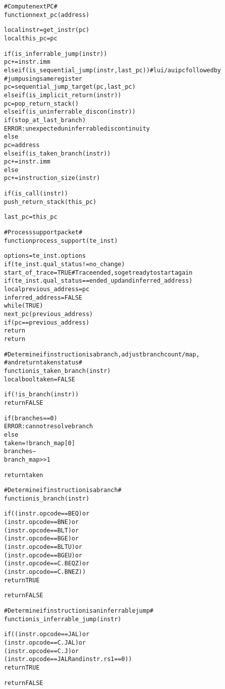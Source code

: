\begin{alltt}
# Compute next PC #
function next_pc (address)

  local instr   = get_instr(pc)
  local this_pc = pc

  if (is_inferrable_jump(instr))
    pc += instr.imm
  else if (is_sequential_jump(instr, last_pc)) # lui/auipc followed by
                                               #  jump using same register
    pc = sequential_jump_target(pc, last_pc)
  else if (is_implicit_return(instr))
    pc = pop_return_stack()
  else if (is_uninferrable_discon(instr))
    if (stop_at_last_branch)
      ERROR: unexpected uninferrable discontinuity
    else
      pc = address
  else if (is_taken_branch(instr))
    pc += instr.imm
  else
    pc += instruction_size(instr)

  if (is_call(instr))
    push_return_stack(this_pc)

  last_pc = this_pc

# Process support packet #
function process_support (te_inst)

  options = te_inst.options
    if (te_inst.qual_status != no_change)
      start_of_trace = TRUE # Trace ended, so get ready to start again
    if (te_inst.qual_status == ended_upd and inferred_address)
      local previous_address = pc
      inferred_address       = FALSE
      while (TRUE)
        next_pc(previous_address)
        if (pc == previous_address)
          return
    return

\end{alltt}

\pagebreak

\begin{alltt}
# Determine if instruction is a branch, adjust branch count/map,
#   and return taken status #
function is_taken_branch (instr)
  local bool taken = FALSE

  if (!is_branch(instr))
    return FALSE

  if (branches == 0)
    ERROR: cannot resolve branch
  else
    taken = !branch_map[0]
    branches--
    branch_map >> 1

  return taken

# Determine if instruction is a branch #
function is_branch (instr)

  if ((instr.opcode == BEQ)    or
      (instr.opcode == BNE)    or
      (instr.opcode == BLT)    or
      (instr.opcode == BGE)    or
      (instr.opcode == BLTU)   or
      (instr.opcode == BGEU)   or
      (instr.opcode == C.BEQZ) or
      (instr.opcode == C.BNEZ))
    return TRUE

  return FALSE

# Determine if instruction is an inferrable jump #
function is_inferrable_jump (instr)

  if ((instr.opcode == JAL)   or
      (instr.opcode == C.JAL) or
      (instr.opcode == C.J)   or
      (instr.opcode == JALR and instr.rs1 == 0))
    return TRUE

  return FALSE
\end{alltt}

